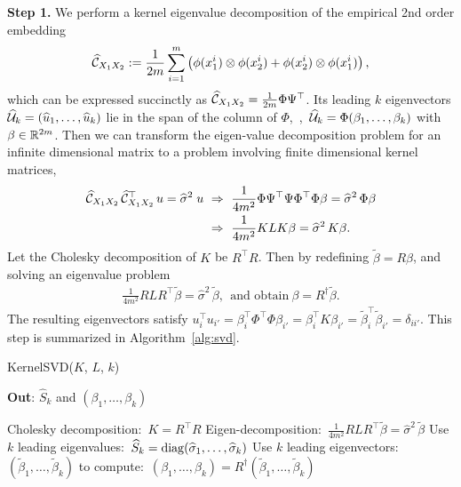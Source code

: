 \documentclass{article}
\begin{document}
{\bf Step 1.} We  perform a kernel eigenvalue decomposition of the empirical 2nd order embedding
$$
  \widehat {\mathcal{C}}_{X_1 X_2}:= \frac{1}{2m} \sum_{i=1}^{m} \left(\phi(x_1^i) \otimes \phi(x_2^i) + \phi(x_2^i) \otimes \phi(x_1^i)\right),
$$
which can be expressed succinctly as $\widehat {\mathcal{C}}_{X_1 X_2} = \frac{1}{2m} \Phi \Psi^\top$.
Its leading $k$ eigenvectors $\widehat {\mathcal{U}}_k = (\widehat u_1,\ldots,\widehat u_k)$  lie in the span of the column of  $\Phi$,~\ie,~$\widehat {\mathcal{U}}_k = \Phi (\beta_1,\ldots,\beta_k)$ with $\beta \in \mathbb{R}^{2m}$. Then we can transform the eigen-value decomposition problem for an infinite dimensional matrix to a problem involving finite dimensional kernel matrices,
\begin{align*}
	\widehat {\mathcal{C}}_{X_1 X_2}\, \widehat {\mathcal{C}}_{X_1 X_2}^\top\, u = \widehat \sigma^2 \;u
	&~\Rightarrow~
	\frac{1}{4m^2}\Phi \Psi^\top \Psi \Phi^\top \Phi \beta = \widehat \sigma^2 \,\Phi \beta \\
	&~\Rightarrow~
	\frac{1}{4m^2} K L K \beta = \widehat \sigma^2 \,K \beta.
\end{align*}
Let the Cholesky decomposition of $K$ be $R^\top R$. Then by redefining $\widetilde{\beta}=R\beta$, and solving an eigenvalue problem
\begin{align}
 \frac{1}{4m^2} R L R^\top \widetilde{\beta} =\widehat  \sigma^2 \, \widetilde{\beta},~~\text{and obtain}~\beta = R^{\dagger} \widetilde{\beta}.
\end{align}
The resulting eigenvectors satisfy $u_i^\top u_{i'} = \beta_i^\top \Phi^\top \Phi \beta_{i'} =  \beta_{i}^\top K  \beta_{i'} =  \widetilde{\beta}_{i}^\top \widetilde{\beta}_{i'}=\delta_{ii'}$.
This step is summarized in Algorithm~\ref{alg:svd}.

\begin{algorithm}[t!]
\caption{KernelSVD($K$, $L$, $k$)}
	\textbf{Out}: $\widehat S_k$ and $(\beta_1,\ldots,\beta_k)$\\[-0.4cm]
  \begin{algorithmic}[1]
    \STATE Cholesky decomposition:\ $K=R^\top R$
    \STATE Eigen-decomposition:\ $\frac{1}{4m^2} R L R^\top \widetilde{\beta} = \widehat \sigma^2\,\widetilde{\beta}$
    \STATE Use $k$ leading eigenvalues:\ $\widehat S_k = \mathop{\mathrm{diag}}(\widehat \sigma_1,\ldots,\widehat \sigma_k)$
    \STATE Use $k$ leading eigenvectors:\ $(\widetilde{\beta}_1,\ldots,\widetilde{\beta}_k)$ to
    compute:\ $(\beta_1,\ldots,\beta_k) = R^\dagger (\widetilde{\beta}_1,\ldots,\widetilde{\beta}_k)$
  \end{algorithmic}
  \label{alg:svd}
\end{algorithm}
\end{document}
